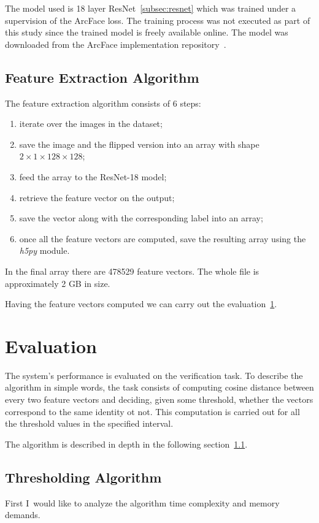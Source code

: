 The model used is 18 layer ResNet~\ref{subsec:resnet} which was trained under a supervision of the ArcFace loss.
The training process was not executed as part of this study since the trained model is freely available online.
The model was downloaded from the ArcFace implementation repository~\cite{ArcFacePyTorch}.

\subsection{Feature Extraction Algorithm}\label{subsec:feexalgo}
The feature extraction algorithm consists of 6 steps:
\begin{enumerate}
    \item iterate over the images in the dataset;
    \item save the image and the flipped version into an array with shape $2\times1\times128\times128$;
    \item feed the array to the ResNet-18 model;
    \item retrieve the feature vector on the output;
    \item save the vector along with the corresponding label into an array;
    \item once all the feature vectors are computed, save the resulting array using the \textit{h5py} module.
\end{enumerate}

In the final array there are 478529 feature vectors.
The whole file is approximately 2 GB in size.

Having the feature vectors computed we can carry out the evaluation~\ref{sec:evaluation}.

\section{Evaluation}\label{sec:evaluation}
The system's performance is evaluated on the verification task.
To describe the algorithm in simple words, the task consists of computing cosine distance between every two feature
vectors and deciding, given some threshold, whether the vectors correspond to the same identity ot not.
This computation is carried out for all the threshold values in the specified interval.

The algorithm is described in depth in the following section~\ref{subsec:thresholding-algorithm}.

\subsection{Thresholding Algorithm}\label{subsec:thresholding-algorithm}
First I would like to analyze the algorithm time complexity and memory demands.

